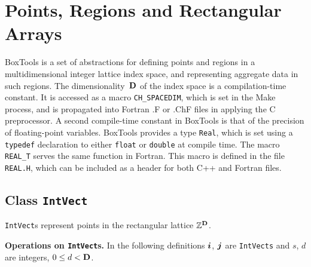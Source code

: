 
\section{Points, Regions and Rectangular Arrays}

BoxTools is a set of abstractions for defining points and regions in a
multidimensional integer lattice index space, and representing
aggregate data in such regions.  The dimensionality~${\mathbf{D}}$ of the index space
is a compilation-time constant.  It is accessed as a macro 
{\tt CH\_SPACEDIM}, which is set in the Make process, and is propagated
into Fortran .F or .ChF files in applying the C preprocessor.
A second compile-time constant in BoxTools is that of the precision of
floating-point variables. BoxTools provides a type {\tt Real}, which is
set using a {\tt typedef} declaration to either {\tt float} or {\tt double}
at compile time. The macro {\tt REAL\_T} serves the same function in
Fortran. This macro is defined in the file {\tt REAL.H}, which can be
included as a header for both C++ and Fortran files.

\subsection{Class {\tt IntVect}}
\label{sec:intvect}

{\tt IntVect}s represent points in the rectangular lattice 
$\mathbb{Z}^{\mathbf{D}}$. 


\noindent
{\bf Operations on {\tt IntVect}s.}
In the following definitions ${\boldsymbol{i}}$, ${\boldsymbol{j}}$ are {\tt{IntVects}}
and $s$, $d$ are integers, $0 \leq d < {\mathbf{D}}$.


